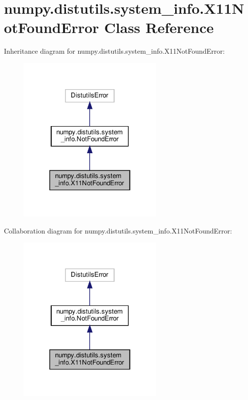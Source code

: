 \hypertarget{classnumpy_1_1distutils_1_1system__info_1_1X11NotFoundError}{}\section{numpy.\+distutils.\+system\+\_\+info.\+X11\+Not\+Found\+Error Class Reference}
\label{classnumpy_1_1distutils_1_1system__info_1_1X11NotFoundError}


Inheritance diagram for numpy.\+distutils.\+system\+\_\+info.\+X11\+Not\+Found\+Error\+:
\nopagebreak
\begin{figure}[H]
\begin{center}
\leavevmode
\includegraphics[width=202pt]{classnumpy_1_1distutils_1_1system__info_1_1X11NotFoundError__inherit__graph}
\end{center}
\end{figure}


Collaboration diagram for numpy.\+distutils.\+system\+\_\+info.\+X11\+Not\+Found\+Error\+:
\nopagebreak
\begin{figure}[H]
\begin{center}
\leavevmode
\includegraphics[width=202pt]{classnumpy_1_1distutils_1_1system__info_1_1X11NotFoundError__coll__graph}
\end{center}
\end{figure}


